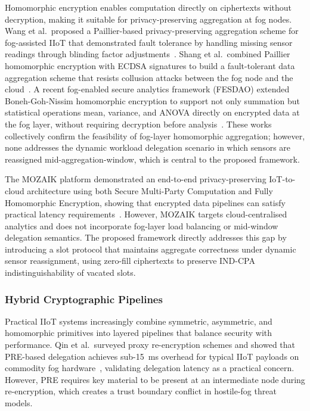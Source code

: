 \documentclass[conference]{IEEEtran}
\begin{document}
Homomorphic encryption enables computation directly on ciphertexts without decryption, making it suitable for privacy-preserving aggregation at fog nodes. Wang et al.\ proposed a Paillier-based privacy-preserving aggregation scheme for fog-assisted IIoT that demonstrated fault tolerance by handling missing sensor readings through blinding factor adjustments~\cite{wang2022}. Shang et al.\ combined Paillier homomorphic encryption with ECDSA signatures to build a fault-tolerant data aggregation scheme that resists collusion attacks between the fog node and the cloud~\cite{shang2023}. A recent fog-enabled secure analytics framework (FESDAO) extended Boneh-Goh-Nissim homomorphic encryption to support not only summation but statistical operations mean, variance, and ANOVA directly on encrypted data at the fog layer, without requiring decryption before analysis~\cite{fesdao2025}. These works collectively confirm the feasibility of fog-layer homomorphic aggregation; however, none addresses the dynamic workload delegation scenario in which sensors are reassigned mid-aggregation-window, which is central to the proposed framework.

The MOZAIK platform demonstrated an end-to-end privacy-preserving IoT-to-cloud architecture using both Secure Multi-Party Computation and Fully Homomorphic Encryption, showing that encrypted data pipelines can satisfy practical latency requirements~\cite{januszewicz2025}. However, MOZAIK targets cloud-centralised analytics and does not incorporate fog-layer load balancing or mid-window delegation semantics. The proposed framework directly addresses this gap by introducing a slot protocol that maintains aggregate correctness under dynamic sensor reassignment, using zero-fill ciphertexts to preserve IND-CPA indistinguishability of vacated slots.

\subsubsection{Hybrid Cryptographic Pipelines}

Practical IIoT systems increasingly combine symmetric, asymmetric, and homomorphic primitives into layered pipelines that balance security with performance. Qin et al.\ surveyed proxy re-encryption schemes and showed that PRE-based delegation achieves sub-15~ms overhead for typical IIoT payloads on commodity fog hardware~\cite{qin2022}, validating delegation latency as a practical concern. However, PRE requires key material to be present at an intermediate node during re-encryption, which creates a trust boundary conflict in hostile-fog threat models.
\end{document}
